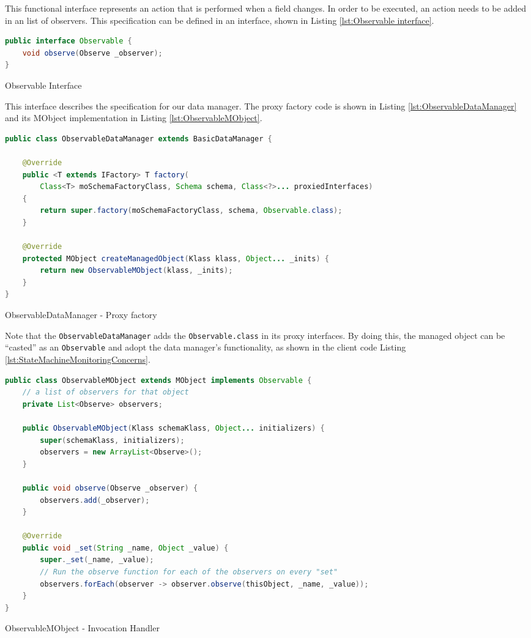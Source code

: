 This functional interface represents an action that is performed when a field changes.
In order to be executed, an action needs to be added in an list of observers.
This specification can be defined in an interface, shown in Listing \ref{lst:Observable interface}.

\begin{sourcecode} [H]
	\begin{lstlisting}[language=Java, escapechar=|]
public interface Observable {
	void observe(Observe _observer);
}
	\end{lstlisting}
	\caption{Observable Interface}
	\label{lst:Observable interface}
\end{sourcecode}

This interface describes the specification for our data manager.
The proxy factory code is shown in Listing \ref{lst:ObservableDataManager} and its MObject implementation in Listing \ref{lst:ObservableMObject}.

\begin{sourcecode} [H]
	\begin{lstlisting}[language=Java, escapechar=|]
public class ObservableDataManager extends BasicDataManager {

    @Override
    public <T extends IFactory> T factory(
    	Class<T> moSchemaFactoryClass, Schema schema, Class<?>... proxiedInterfaces) 
    {
        return super.factory(moSchemaFactoryClass, schema, Observable.class);
    }

    @Override
    protected MObject createManagedObject(Klass klass, Object... _inits) {
        return new ObservableMObject(klass, _inits);
    }
}
	\end{lstlisting}
	\caption{ObservableDataManager - Proxy factory}
	\label{lst:ObservableDataManager}
\end{sourcecode}

Note that the \texttt{ObservableDataManager} adds the \texttt{Observable.class} in its proxy interfaces.
By doing this, the managed object can be ``casted'' as an \texttt{Observable} and adopt the data manager's functionality, as shown in the client code Listing \ref{lst:StateMachineMonitoringConcerns}.

\begin{sourcecode} [H]
	\begin{lstlisting}[language=Java, escapechar=|]
public class ObservableMObject extends MObject implements Observable {
	// a list of observers for that object
	private List<Observe> observers;

	public ObservableMObject(Klass schemaKlass, Object... initializers) {
		super(schemaKlass, initializers);
		observers = new ArrayList<Observe>();
	}

	public void observe(Observe _observer) {
		observers.add(_observer);
	}

	@Override
	public void _set(String _name, Object _value) {
		super._set(_name, _value);
		// Run the observe function for each of the observers on every "set"
		observers.forEach(observer -> observer.observe(thisObject, _name, _value));
	}
}
	\end{lstlisting}
	\caption{ObservableMObject - Invocation Handler}
	\label{lst:ObservableMObject}
\end{sourcecode}

